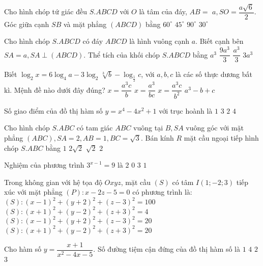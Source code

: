 \begin{ex}%
Cho hình chóp tứ giác đều $S.ABCD$ với $O$ là tâm của đáy, $AB=$ $a, SO=\dfrac{a \sqrt{6}}{2}$. Góc giữa cạnh $SB$ và mặt phẳng $(ABCD)$ bằng
\choice
{\True $60^{\circ}$}
{$45^{\circ}$}
{$90^{\circ}$}
{$30^{\circ}$}

\end{ex}
\begin{ex}%
Cho hình chóp $S.ABCD$ có đáy $ABCD$ là hình vuông cạnh $a$. Biết cạnh bên $SA=a, SA \perp(ABCD)$. Thể tích của khối chóp $S.ABCD$ bằng
\choice
{$a^3$}
{$\dfrac{9 a^3}{3}$}
{\True $\dfrac{a^3}{3}$}
{$3 a^3$}

\end{ex}
\begin{ex}%
Biết $\log_2 x=6\log_4 a-3\log_2 \sqrt[3]{b}-\log_{\frac{1}{2}} c$, với $a, b, c$ là các số thực dương bất kì. Mệnh đề nào dưới đây đúng?
\choice
{\True $x=\dfrac{a^3 c}{b}$}
{$x=\dfrac{a^3}{b c}$}
{$x=\dfrac{a^3 c}{b^2}$}
{$a^3-b+c$}

\end{ex}
\begin{ex}%
Số giao điểm của đồ thị hàm số $y=x^4-4 x^2+1$ với trục hoành là
\choice
{$1$}
{$3$}
{$2$}
{\True $4$}

\end{ex}
\begin{ex}%
Cho hình chóp $S.ABC$ có tam giác $ABC$ vuông tại $B, SA$ vuông góc với mặt phẳng $(ABC), SA=2, AB=1, BC=\sqrt{3}$. Bán kính $R$ mặt cầu ngoại tiếp hình chóp $S.ABC$ bằng
\choice
{$1$}
{$2\sqrt{2}$}
{\True $\sqrt{2}$}
{$2$}

\end{ex}
\begin{ex}%
Nghiệm của phương trình $3^{x-1}=9$ là
\choice
{$2$}
{$0$}
{\True $3$}
{$1$}

\end{ex}
\begin{ex}%
Trong không gian với hệ tọa độ $O x y z$, mặt cầu $(S)$ có tâm $I(1;-2; 3)$ tiếp xúc với mặt phẳng $(P)\colon x-2 z-5=0$ có phương trình là:
\choice
{$(S)\colon(x-1)^2+(y+2)^2+(z-3)^2=100$}
{$(S)\colon(x+1)^2+(y-2)^2+(z+3)^2=4$}
{\True $(S)\colon(x-1)^2+(y+2)^2+(z-3)^2=20$}
{$(S)\colon(x+1)^2+(y-2)^2+(z+3)^2=20$}

\end{ex}
\begin{ex}%
Cho hàm số $y=\dfrac{x+1}{x^2-4 x-5}$. Số đường tiệm cận đứng của đồ thị hàm số là
\choice
{\True $1$}
{$4$}
{$2$}
{$3$}

\end{ex}
